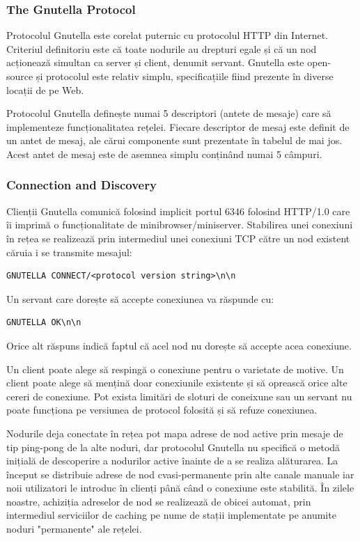 \subsubsection{The Gnutella Protocol}

Protocolul Gnutella este corelat puternic cu protocolul HTTP din Internet.
Criteriul definitoriu este că toate nodurile au drepturi egale și că un nod
acționează simultan ca server și client, denumit servant. Gnutella este
open-source și protocolul este relativ simplu, specificațiile fiind prezente
în diverse locații de pe Web.

Protocolul Gnutella definește numai 5 descriptori (antete de mesaje) care să
implementeze funcționalitatea rețelei. Fiecare descriptor de mesaj este
definit de un antet de mesaj, ale cărui componente sunt prezentate în tabelul
de mai jos. Acest antet de mesaj este de asemnea simplu conținând numai 5
câmpuri.

\subsubsection{Connection and Discovery}

Clienții Gnutella comunică folosind implicit portul 6346 folosind HTTP/1.0
care îi imprimă o funcționalitate de minibrowser/miniserver. Stabilirea unei
conexiuni în rețea se realizează prin intermediul unei conexiuni TCP către un
nod existent căruia i se transmite mesajul:

\begin{verbatim}
GNUTELLA CONNECT/<protocol version string>\n\n
\end{verbatim}

Un servant care dorește să accepte conexiunea va răspunde cu:
\begin{verbatim}
GNUTELLA OK\n\n
\end{verbatim}

Orice alt răspuns indică faptul că acel nod nu dorește să accepte acea
conexiune.

Un client poate alege să respingă o conexiune pentru o varietate de motive. Un
client poate alege să mențină doar conexiunile existente și să oprească orice
alte cereri de conexiune. Pot exista limitări de sloturi de coneixune sau un
servant nu poate funcționa pe versiunea de protocol folosită și să refuze
conexiunea.

Nodurile deja conectate în rețea pot mapa adrese de nod active prin mesaje de
tip ping-pong de la alte noduri, dar protocolul Gnutella nu specifică o metodă
inițială de descoperire a nodurilor active înainte de a se realiza alăturarea.
La început se distribuie adrese de nod cvasi-permanente prin alte canale
manuale iar noii utilizatori le introduc în clienți până când o conexiune este
stabilită. În zilele noastre, achiziția adreselor de nod se realizează de
obicei automat, prin intermediul serviciilor de caching pe nume de stații
implementate pe anumite noduri "permanente" ale rețelei.

